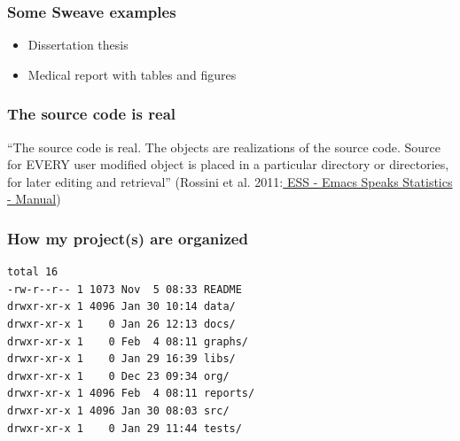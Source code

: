 \documentclass[bigger]{beamer}
\begin{document}
\begin{frame}
\frametitle{Some Sweave examples}
\label{sec-2_4}
\begin{itemize}

\item Dissertation thesis\\
\label{sec-2_4_1}%
\item Medical report with tables and figures\\
\label{sec-2_4_2}%
\end{itemize} %
\end{frame}
\begin{frame}
\frametitle{The source code is real}
\label{sec-2_5}


``The source code is real. The objects are realizations of the source code. Source for EVERY user
modified object is placed in a particular directory or directories, for later editing and retrieval''
(Rossini et al. 2011:\href{http://ess.r-project.org/Manual/ess.html}{ ESS - Emacs Speaks Statistics - Manual})
\end{frame}
\begin{frame}[fragile]
\frametitle{How my project(s) are organized}
\label{sec-2_6}




\begin{lstlisting}
total 16
-rw-r--r-- 1 1073 Nov  5 08:33 README
drwxr-xr-x 1 4096 Jan 30 10:14 data/
drwxr-xr-x 1    0 Jan 26 12:13 docs/
drwxr-xr-x 1    0 Feb  4 08:11 graphs/
drwxr-xr-x 1    0 Jan 29 16:39 libs/
drwxr-xr-x 1    0 Dec 23 09:34 org/
drwxr-xr-x 1 4096 Feb  4 08:11 reports/
drwxr-xr-x 1 4096 Jan 30 08:03 src/
drwxr-xr-x 1    0 Jan 29 11:44 tests/
\end{lstlisting}
\end{frame}
\end{document}
